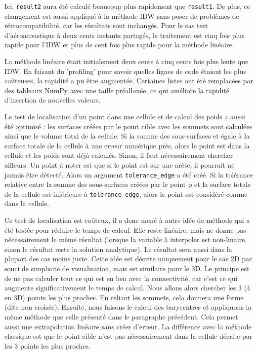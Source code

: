 Ici, \texttt{result2} aura été calculé beaucoup plus rapidement que \texttt{result1}. De plus, ce changement est aussi appliqué à la méthode IDW sans poser de problèmes de rétrocompatibilité, car les résultats sont inchangés. Pour le cas test d'aéroacoustique à deux cents instants partagés, le traitement est cinq fois plus rapide pour l'IDW et plus de cent fois plus rapide pour la méthode linéaire.


La méthode linéaire était initialement deux cents à cinq cents fois plus lente que IDW. En faisant du 'profiling' pour savoir quelles lignes de code étaient les plus coûteuses, la rapidité a pu être augmentée. Certaines listes ont été remplacées par des tableaux NumPy avec une taille préallouée, ce qui améliore la rapidité d'insertion de nouvelles valeurs.

Le test de localisation d'un point dans une cellule et de calcul des poids a aussi été optimisé : les surfaces créées par le point cible avec les sommets sont calculées ainsi que le volume total de la cellule. Si la somme des sous-surfaces et égale à la surface totale de la cellule à une erreur numérique près, alors le point est dans la cellule et les poids sont déjà calculés. Sinon, il faut nécessairement chercher ailleurs. Un point à noter est que si le point est sur une arête, il pourrait ne jamais être détecté. Alors un argument \texttt{tolerance\_edge} a été créé. Si la tolérance relative entre la somme des sous-surfaces créées par le point p et la surface totale de la cellule est inférieure à \texttt{tolerance\_edge}, alors le point est considéré comme dans la cellule. %

Ce test de localisation est coûteux, il a donc mené à autre idée de méthode qui a été testée pour réduire le temps de calcul. Elle reste linéaire, mais ne donne pas nécessairement le même résultat (lorsque la variable à interpoler est non-linaire, sinon le résultat reste la solution analytique). Le résultat sera aussi dans la plupart des cas moins juste. Cette idée est décrite uniquement pour le cas 2D par souci de simplicité de visualisation, mais est similaire pour le 3D.
Le principe est de ne pas calculer tout ce qui est en lien avec la connectivité, car c'est ce qui augmente significativement le temps de calcul.
Nous allons alors chercher les 3 (4 en 3D) points les plus proches. En reliant les sommets, cela donnera une forme (dite non croisée). 
Ensuite, nous faisons le calcul des barycentres et appliquons la même méthode que celle présenté dans le paragraphe précédent. Cela permet aussi une extrapolation linéaire sans créer d'erreur.
La différence avec la méthode classique est que le point cible n'est pas nécessairement dans la cellule décrite par les 3 points les plus proches.


